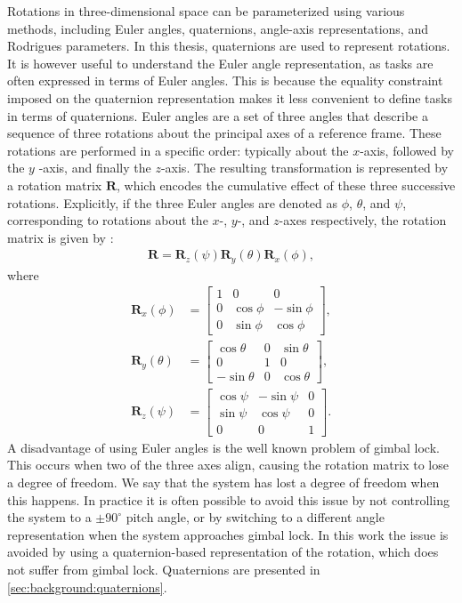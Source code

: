Rotations in three-dimensional space can be parameterized using various methods,
including Euler angles, quaternions, angle-axis representations, and
Rodrigues parameters.
In this thesis, quaternions are used to represent rotations. It is however
useful to understand the Euler angle representation, as tasks
are often expressed in terms of Euler angles. This is because the equality
constraint imposed on the quaternion representation makes it less convenient
to define tasks in terms of quaternions.
Euler angles are a set of three angles that describe a sequence of three
rotations about the principal axes of a reference frame. These rotations are
performed in a specific order: typically about the $x$-axis, followed by the $y$
-axis, and finally the $z$-axis. The resulting transformation is represented by
a rotation matrix $\bm{R}$, which encodes the cumulative effect of these three
successive rotations.
Explicitly, if the three Euler angles are denoted as $\phi$, $\theta$, and $\psi$,
corresponding to rotations about the $x$-, $y$-, and $z$-axes respectively,
the rotation matrix is given by \cite{modsim}:
\begin{align}
    \bm{R} = \bm{R}_z(\psi) \bm{R}_y(\theta) \bm{R}_x(\phi),
\end{align}
where
\begin{subequations}
\label{eq:bp:so3:rotations}
\begin{align}
    \bm{R}_x(\phi) &= \begin{bmatrix}
        1 & 0 & 0 \\
        0 & \cos\phi & -\sin\phi \\
        0 & \sin\phi & \cos\phi
    \end{bmatrix}, \\
    \bm{R}_y(\theta) &= \begin{bmatrix}
        \cos\theta & 0 & \sin\theta \\
        0 & 1 & 0 \\
        -\sin\theta & 0 & \cos\theta
    \end{bmatrix}, \\
    \bm{R}_z(\psi) &= \begin{bmatrix}
        \cos\psi & -\sin\psi & 0 \\
        \sin\psi & \cos\psi & 0 \\
        0 & 0 & 1
    \end{bmatrix}.
\end{align}
\end{subequations}
A disadvantage of using Euler angles is the well known problem of gimbal lock.
This occurs when two of the three axes align, causing the rotation matrix to
lose a degree of freedom. We say that the system has lost a degree of freedom
when this happens. In practice it is often possible to avoid this issue by not
controlling the system to a $\pm90^\circ$ pitch angle, or by switching to a
different angle representation when the system approaches gimbal lock. In this
work the issue is avoided by using a quaternion-based representation of the
rotation, which does not suffer from gimbal lock. Quaternions are presented
in \autoref{sec:background:quaternions}.

